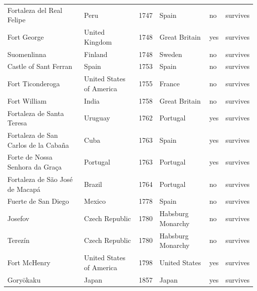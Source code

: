 \documentclass[11pt,a4paper]{article}
\begin{document}
{\begin{longtable}{p{4.6cm}p{3.2cm}rp{3.2cm}ll}
Fortaleza del Real Felipe & Peru & 1747 & Spain & no & survives\\
Fort George & United Kingdom & 1748 & Great Britain & yes & survives\\
Suomenlinna & Finland & 1748 & Sweden & no & survives\\
Castle of Sant Ferran & Spain & 1753 & Spain & no & survives\\
Fort Ticonderoga & United States of America & 1755 & France & no & survives\\
Fort William & India & 1758 & Great Britain & no & survives\\
Fortaleza de Santa Teresa & Uruguay & 1762 & Portugal & yes & survives\\
Fortaleza de San Carlos de la Cabaña & Cuba & 1763 & Spain & yes & survives\\
Forte de Nossa Senhora da Graça & Portugal & 1763 & Portugal & yes & survives\\
Fortaleza de São José de Macapá & Brazil & 1764 & Portugal & no & survives\\
Fuerte de San Diego & Mexico & 1778 & Spain & no & survives\\
Josefov & Czech Republic & 1780 & Habsburg Monarchy & no & survives\\
Terezín & Czech Republic & 1780 & Habsburg Monarchy & no & survives\\
Fort McHenry & United States of America & 1798 & United States & yes & survives\\
Goryōkaku & Japan & 1857 & Japan & yes & survives\\
\bottomrule\end{longtable}}
\end{document}
